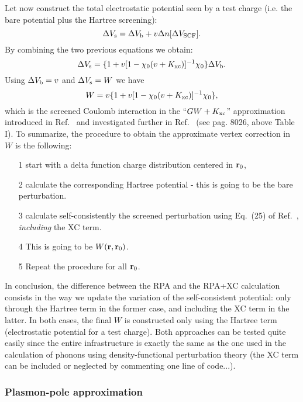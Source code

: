 \documentclass[12pt]{article}
\def\r{{\bf r}}
\begin{document}
Let now construct the total electrostatic potential seen by a test charge (i.e. the bare potential plus
the Hartree screening):
 \begin{equation}
 \Delta V_{\rm s} = \Delta V_{\rm b} + v \Delta n[\Delta V_{\rm SCF}].
 \end{equation}
By combining the two previous equations we obtain:
 \begin{equation}
 \Delta V_{\rm s} = \{ 1 + v [1-\chi_0 (v+K_{\rm xc})]^{-1}\chi_0 \} \Delta V_{\rm b}.
 \end{equation}
Using $\Delta V_{\rm b} = v$ and $\Delta V_{\rm s} = W$ we have 
 \begin{equation}
 W = v \{ 1 + v [1-\chi_0 (v+K_{\rm xc})]^{-1}\chi_0 \},
 \end{equation}
which is the screened Coulomb interaction in the ``$GW+K_{\rm xc}$'' approximation introduced
in Ref.\ \cite{hl86} and investigated further in Ref.\ \cite{reining94} (see pag. 8026, above Table I).
%
To summarize, the procedure to obtain the approximate vertex correction in $W$ is the following:
\begin{itemize}
\item[1] start with a delta function charge distribution
centered in $\r_0$,
\item[2] calculate the corresponding Hartree potential - this is going to be the bare perturbation.
\item[3] calculate self-consistently the screened perturbation using Eq.\ (25) of Ref.\ \cite{baroni}, {\it including}
 the XC term.
\item[4] This is going to be $W(\r,\r_0)$.
\item[5] Repeat the procedure for all $\r_0$.
\end{itemize}
%
In conclusion, the difference between the RPA and the RPA+XC calculation consists in the way
we update the variation of the self-consistent potential: only through the Hartree term
in the former case, and including the XC term in the latter. In both cases, the final $W$
is constructed only using the Hartree term (electrostatic potential for a test charge).
Both approaches can be tested quite easily since the entire infrastructure is exactly
the same as the one used in the calculation of phonons using density-functional perturbation theory
(the XC term can be included or neglected by commenting one line of code...).

\subsubsection*{Plasmon-pole approximation}
\end{document}
